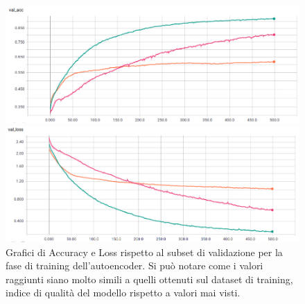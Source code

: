 \begin{figure}[htbp]
    \centering
    \begin{minipage}[t]{\linewidth}
    	\includegraphics[width=\linewidth]{figures/autoenc3.png}
    \end{minipage}\hfill
    \begin{minipage}[b]{\linewidth}
    	\includegraphics[width=\linewidth]{figures/autoenc4.png}
    \end{minipage}
    
\caption{Grafici di Accuracy e Loss rispetto al subset di validazione per la fase di training dell'autoencoder. Si può notare come i valori raggiunti siano molto simili a quelli ottenuti sul dataset di training, indice di qualità del modello rispetto a valori mai visti. \label{fig:aut2} }
\end{figure}

